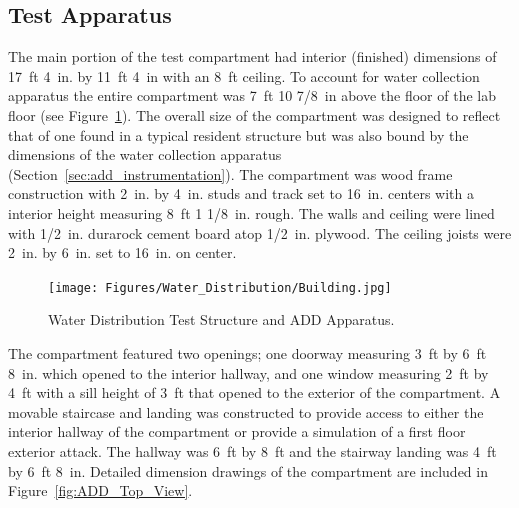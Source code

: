 \documentclass[12pt,oneside]{book}
\begin{document}
\subsection{Test Apparatus}
\label{ADD_discussion}
The main portion of the test compartment had interior (finished) dimensions of 17~ft 4~in. by 11~ft 4~in with an 8~ft ceiling. To account for water collection apparatus the entire compartment was 7~ft 10 7/8~in above the floor of the lab floor (see Figure~\ref{fig:Water_Distribution_Test_Structure_and_ADD_Apparatus}). The overall size of the compartment was designed to reflect that of one found in a typical resident structure but was also bound by the dimensions of the water collection apparatus (Section~\ref{sec:add_instrumentation}). The compartment was wood frame construction with 2~in. by 4~in. studs and track set to 16~in. centers with a interior height measuring 8~ft 1 1/8~in. rough. The walls and ceiling were lined with 1/2~in. durarock cement board atop 1/2~in. plywood. The ceiling joists were 2~in. by 6~in. set to 16~in. on center.

\begin{figure}[!ht]
	\centering
	\texttt{[image: Figures/Water\_Distribution/Building.jpg]}
	\caption[Water Distribution Test Structure and ADD Apparatus]{Water Distribution Test Structure and ADD Apparatus.}
	\label{fig:Water_Distribution_Test_Structure_and_ADD_Apparatus}
\end{figure}

The compartment featured two openings; one doorway measuring 3~ft by 6~ft 8~in. which opened to the interior hallway, and one window measuring 2~ft by 4~ft with a sill height of 3~ft that opened to the exterior of the compartment. A movable staircase and landing was constructed to provide access to either the interior hallway of the compartment or provide a simulation of a first floor exterior attack. The hallway was 6~ft by 8~ft and the stairway landing was 4~ft by 6~ft 8~in. Detailed dimension drawings of the compartment are included in Figure~\ref{fig:ADD_Top_View}.
\end{document}

